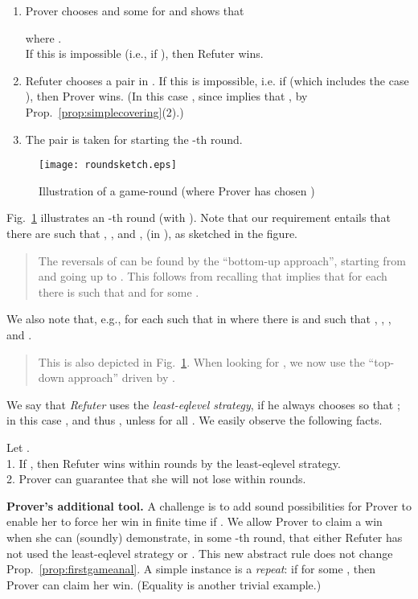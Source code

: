 \documentclass{llncs}
\begin{document}
\begin{enumerate}
\item
Prover chooses  and some 
 for 
and shows that 
  
where .
\\
If this is impossible 
(i.e., if ), then Refuter
wins.
\item
Refuter chooses a pair  in 
. 
If this is impossible, i.e. 
if  (which includes the
case ),
then  Prover wins.
(In this case  , 
since   implies that 
,
by Prop.~\ref{prop:simplecovering}(2).)
\item
The pair  is taken for starting 
the -th round.
\end{enumerate}
\begin{figure}\centering
\texttt{[image: roundsketch.eps]}
\caption{Illustration of a game-round (where Prover has chosen )}
\label{fig:roundsketch}
\end{figure}
Fig.~\ref{fig:roundsketch} illustrates an -th round (with
).
Note that 
our requirement 
entails that there are  such that , , and , 
 (in ), as sketched in the
figure.
\begin{quote}
	{\small	
The reversals of  can be found by the ``bottom-up
approach'', starting from
  and going up to .
This follows from recalling that  implies that 
for each  there is  such that 
 and  for some .
}
\end{quote}
We also note that, e.g., 
for each  such that  in 
where  there is  and  such that 
, , ,
and .
\begin{quote}
	{\small	
This is also depicted in Fig.~\ref{fig:roundsketch}. When looking for
, we now use the
``top-down approach'' driven by .
}
\end{quote}
We say that \emph{Refuter} uses the \emph{least-eqlevel strategy}, if
he always chooses  so that 
; in this case 
,
and thus ,
unless  for all 
.
We easily observe the following facts.

\begin{proposition}\label{prop:firstgameanal}
	Let .
\\
1. If , then Refuter  wins within  rounds by 
the least-eqlevel strategy. 
\\
2. Prover can guarantee that she will not lose within  rounds.
\end{proposition}	




\smallskip

\textbf{Prover's additional tool.}
A challenge is to add sound possibilities for Prover to enable her to
force her win in finite time if .
We allow
Prover to claim a win 
when she can (soundly) demonstrate, in some -th round, 
that either Refuter has not used the least-eqlevel strategy 
or .
This new abstract rule does not
change Prop.~\ref{prop:firstgameanal}.
A simple instance 
is a \emph{repeat}: if 
 for some ,
then Prover can claim her win. 
(Equality  is another trivial example.)
\end{document}
